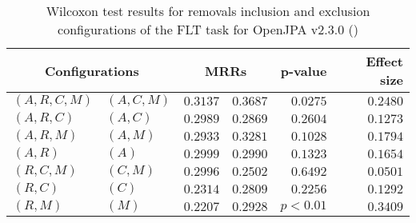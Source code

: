 
\begin{table}
\begin{spacing}{1.2}
\centering
\caption{Wilcoxon test results for removals inclusion and exclusion configurations of the FLT task for OpenJPA v2.3.0 (\ctwo)}
\label{table:versus-wilcox-openjpa-flt-removals}
\begin{tabular}{ll|rr|rr}
\toprule
      \multicolumn{2}{c|}{Configurations} &                \multicolumn{2}{c|}{MRRs} &             p-value & Effect size \\
\midrule
 $(A,R,C,M)$ &  $(A,C,M)$ &       $0.3137$ &  $\bm{0.3687}$ & $0.0275$ &    $0.2480$ \\
   $(A,R,C)$ &    $(A,C)$ &  $\bm{0.2989}$ &       $0.2869$ & $0.2604$ &    $0.1273$ \\
   $(A,R,M)$ &    $(A,M)$ &       $0.2933$ &  $\bm{0.3281}$ & $0.1028$ &    $0.1794$ \\
     $(A,R)$ &      $(A)$ &  $\bm{0.2999}$ &       $0.2990$ & $0.1323$ &    $0.1654$ \\
   $(R,C,M)$ &    $(C,M)$ &  $\bm{0.2996}$ &       $0.2502$ & $0.6492$ &    $0.0501$ \\
     $(R,C)$ &      $(C)$ &       $0.2314$ &  $\bm{0.2809}$ & $0.2256$ &    $0.1292$ \\
     $(R,M)$ &      $(M)$ &       $0.2207$ &  $\bm{0.2928}$ & $p<0.01$ &    $0.3409$ \\
\bottomrule
\end{tabular}

\end{spacing}
\end{table}

